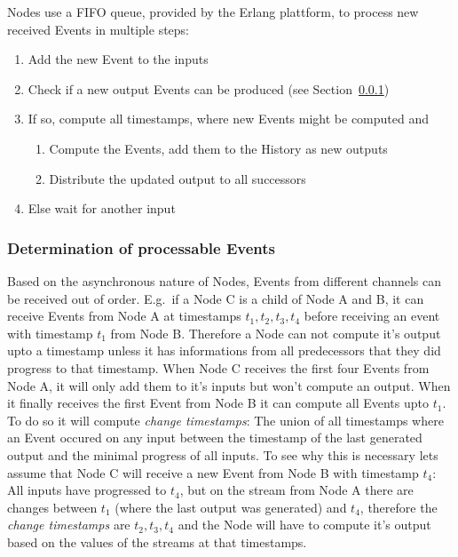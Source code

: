 Nodes use a FIFO queue, provided by the Erlang plattform, to process new received Events in multiple steps:
\begin{enumerate}
  \item Add the new Event to the inputs
  \item Check if a new output Events can be produced (see Section~\ref{sec:concepts:defs:nodes:processable})
  \item If so, compute all timestamps, where new Events might be computed and
    \begin{enumerate}
      \item Compute the Events, add them to the History as new outputs
      \item Distribute the updated output to all successors
    \end{enumerate}
  \item Else wait for another input
\end{enumerate}

\subsubsection{Determination of processable Events}
\label{sec:concepts:defs:nodes:processable}

Based on the asynchronous nature of Nodes, Events from different channels can be received out of order.
E.g.\ if a Node C is a child of Node A and B, it can receive Events from Node A at timestamps \(t_1, t_2, t_3, t_4\)
before receiving an event with timestamp \(t_1\) from Node B.
Therefore a Node can not compute it's output upto a timestamp unless it has informations from all predecessors that they did progress to that timestamp.
When Node C receives the first four Events from Node A, it will only add them to it's inputs but won't compute an output.
When it finally receives the first Event from Node B it can compute all Events upto \(t_1\).
To do so it will compute \emph{change timestamps}: The union of all timestamps where an Event occured on any input between the timestamp of the last generated output and the minimal progress of all inputs.
To see why this is necessary lets assume that Node C will receive a new Event from Node B with timestamp \(t_4\):
All inputs have progressed to \(t_4\), but on the stream from Node A there are changes between \(t_1\) (where the last output was generated) and \(t_4\),
therefore the \emph{change timestamps} are \(t_2, t_3, t_4\) and the Node will have to compute it's output based on the values of the streams at that timestamps.


